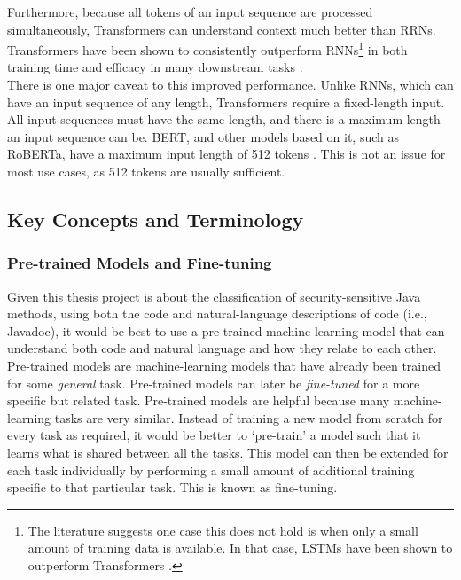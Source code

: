\noindent
Furthermore, because all tokens of an input sequence are processed simultaneously, Transformers can understand context much better than RRNs. Transformers have been shown to consistently outperform RNNs\footnote{The literature suggests one case this does not hold is when only a small amount of training data is available. In that case, LSTMs have been shown to outperform Transformers \cite{transformer-bad}.} in both training time and efficacy in many downstream tasks \cite{attention}\cite{asr-rnn-transformer}.\\

\label{token_limit}
\noindent
There is one major caveat to this improved performance. Unlike RNNs, which can have an input sequence of any length, Transformers require a fixed-length input. All input sequences must have the same length, and there is a maximum length an input sequence can be. BERT, and other models based on it, such as RoBERTa, have a maximum input length of 512 tokens \cite{bert}. This is not an issue for most use cases, as 512 tokens are usually sufficient. \\


\subsection{Key Concepts and Terminology}

\subsubsection{Pre-trained Models and Fine-tuning}
\label{fine-tuning}

\noindent
Given this thesis project is about the classification of security-sensitive Java methods, using both the code and natural-language descriptions of code (i.e., Javadoc), it would be best to use a pre-trained machine learning model that can understand both code and natural language and how they relate to each other. \\

\noindent
Pre-trained models are machine-learning models that have already been trained for some \emph{general} task. Pre-trained models can later be \emph{fine-tuned} for a more specific but related task. Pre-trained models are helpful because many machine-learning tasks are very similar. Instead of training a new model from scratch for every task as required, it would be better to `pre-train' a model such that it learns what is shared between all the tasks. This model can then be extended for each task individually by performing a small amount of additional training specific to that particular task. This is known as fine-tuning.\\

